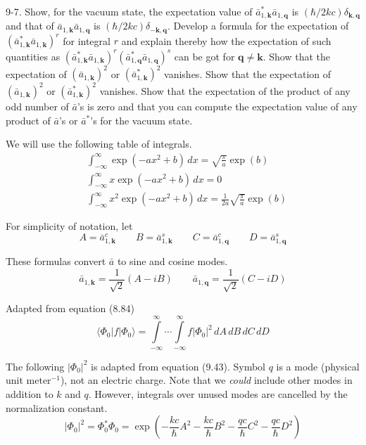 \documentclass[12pt]{article}
\newcommand\U{\vert\Phi_0\vert^2}
\begin{document}
9-7.
Show, for the vacuum state, the expectation value
of $\bar a_{1,\mathbf k}^*\bar a_{1,\mathbf q}$
is $(\hbar/2kc)\delta_{\mathbf k,\mathbf q}$ and that
of $\bar a_{1,\mathbf k}\bar a_{1,\mathbf q}$
is $(\hbar/2kc)\delta_{-\mathbf k,\mathbf q}$.
Develop a formula for the expectation of
$(\bar a_{1,\mathbf k}^*\bar a_{1,\mathbf k})^r$
for integral $r$ and explain thereby how the expectation of such
quantities as
$(\bar a_{1,\mathbf k}^*\bar a_{1,\mathbf k})^r
(\bar a_{1,\mathbf q}^*\bar a_{1,\mathbf q})^s$
can be got for $\mathbf q\ne\mathbf k$.
Show that the expectation of 
$(\bar a_{1,\mathbf k})^2$ or
$(\bar a_{1,\mathbf k}^*)^2$ vanishes.
Show that the expectation of 
$(\bar a_{1,\mathbf k})^2$ or
$(\bar a_{1,\mathbf k}^*)^2$ vanishes.
Show that the expectation of the product of any odd number of
$\bar a$'s is zero and that you can compute the expectation value of
any product of $\bar a$'s or $\bar a^*$'s for the vacuum state.

\bigskip
We will use the following table of integrals.
\begin{align*}
&\int_{-\infty}^\infty\exp(-ax^2+b)\,dx=\sqrt{\frac{\pi}{a}}\exp(b)
\tag{1}
\\
&\int_{-\infty}^\infty x\exp(-ax^2+b)\,dx=0
\tag{2}
\\
&\int_{-\infty}^\infty x^2\exp(-ax^2+b)\,dx=\frac{1}{2a}\sqrt{\frac{\pi}{a}}\exp(b)
\tag{3}
\end{align*}

For simplicity of notation, let
\begin{equation*}
A=\bar a_{1,\mathbf k}^c
\qquad
B=\bar a_{1,\mathbf k}^s
\qquad
C=\bar a_{1,\mathbf q}^c
\qquad
D=\bar a_{1,\mathbf q}^s
\end{equation*}

These formulas convert $\bar a$ to sine and cosine modes.
\begin{equation*}
\bar a_{1,\mathbf k}=\frac{1}{\sqrt2}(A-iB)
\qquad
\bar a_{1,\mathbf q}=\frac{1}{\sqrt2}(C-iD)
\tag{4}
\end{equation*}

Adapted from equation (8.84)
\begin{equation*}
\langle\Phi_0|f|\Phi_0\rangle
=\int\limits_{-\infty}^\infty\cdots\int\limits_{-\infty}^\infty
f\U
\,dA\,dB\,dC\,dD
\end{equation*}

The following $\U$ is adapted from equation (9.43).
Symbol $q$ is a mode (physical unit $\text{meter}^{-1}$), not an electric charge.
Note that we {\it could} include other modes in addition to $k$ and $q$.
However, integrals over unused modes are
cancelled by the normalization constant.
\begin{equation*}
\U=\Phi_0^*\Phi_0=\exp\left(
-\frac{kc}{\hbar}A^2
-\frac{kc}{\hbar}B^2
-\frac{qc}{\hbar}C^2
-\frac{qc}{\hbar}D^2
\right)
\end{equation*}
\end{document}
